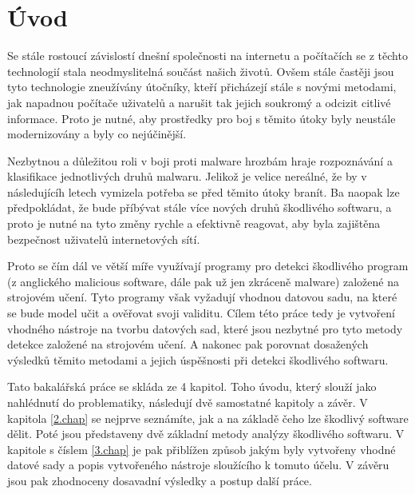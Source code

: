 
%

\chapter{Úvod}

Se stále rostoucí závislostí dnešní společnosti na internetu a počítačích se z těchto technologií stala neodmyslitelná součást našich životů. 
Ovšem stále častěji jsou tyto technologie zneužívány útočníky, kteří přicházejí stále s novými metodami, jak napadnou počítače uživatelů a narušit tak jejich soukromý a odcizit citlivé informace.
Proto je nutné, aby prostředky pro boj s těmito útoky byly neustále modernizovány a byly co nejúčinější.

Nezbytnou a důležitou roli v boji proti malware hrozbám hraje rozpoznávání a klasifikace jednotlivých druhů malwaru.
Jelikož je velice nereálné, že by v následujícíh letech vymizela potřeba se před těmito útoky branít. Ba naopak lze předpokládat, že 
bude příbývat stále více nových druhů škodlivého softwaru, a proto je nutné na tyto změny rychle a efektivně reagovat, aby byla zajištěna
bezpečnost uživatelů internetových sítí.

Proto se čím dál ve větší míře využívají programy pro detekci škodlivého program (z anglického malicious software, dále pak už jen zkráceně malware) založené na strojovém učení. Tyto programy však vyžadují vhodnou datovou sadu, na které se bude model učit a ověřovat svoji validitu.
Cílem této práce tedy je vytvoření vhodného nástroje na tvorbu datových sad, které jsou nezbytné pro tyto metody detekce založené na strojovém učení.
A nakonec pak porovnat dosažených výsledků těmito metodami a jejich úspěšnosti při detekci škodlivého softwaru.

Tato bakalářská práce se skláda ze 4 kapitol. Toho úvodu, který slouží jako nahlédnutí do problematiky, následují dvě samostatné kapitoly a závěr. V kapitola \ref{2.chap} se nejprve seznámíte, jak a na základě čeho lze škodlivý software dělit.
Poté jsou představeny dvě základní metody analýzy škodlivého softwaru.
V kapitole s číslem \ref{3.chap} je pak přiblížen způsob jakým byly vytvořeny vhodné datové sady a popis vytvořeného nástroje sloužícího k tomuto účelu. V závěru jsou pak zhodnoceny dosavadní výsledky a postup další práce.

